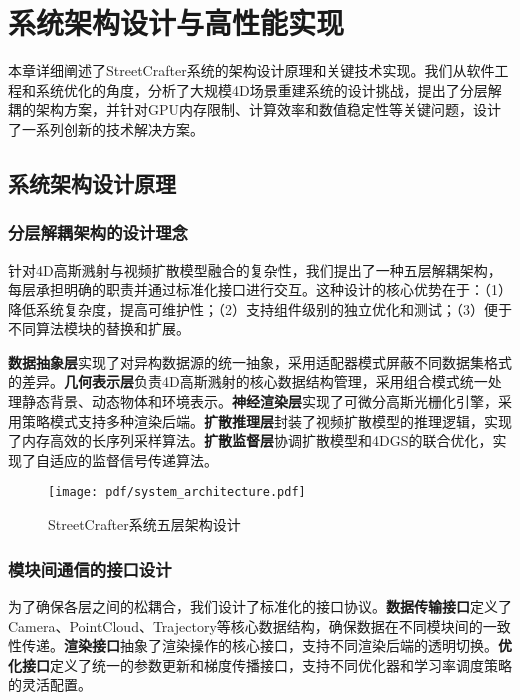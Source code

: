 
\chapter{系统架构设计与高性能实现}

本章详细阐述了StreetCrafter系统的架构设计原理和关键技术实现。我们从软件工程和系统优化的角度，分析了大规模4D场景重建系统的设计挑战，提出了分层解耦的架构方案，并针对GPU内存限制、计算效率和数值稳定性等关键问题，设计了一系列创新的技术解决方案。

\section{系统架构设计原理}

\subsection{分层解耦架构的设计理念}

针对4D高斯溅射与视频扩散模型融合的复杂性，我们提出了一种五层解耦架构，每层承担明确的职责并通过标准化接口进行交互。这种设计的核心优势在于：（1）降低系统复杂度，提高可维护性；（2）支持组件级别的独立优化和测试；（3）便于不同算法模块的替换和扩展。

\textbf{数据抽象层}实现了对异构数据源的统一抽象，采用适配器模式屏蔽不同数据集格式的差异。\textbf{几何表示层}负责4D高斯溅射的核心数据结构管理，采用组合模式统一处理静态背景、动态物体和环境表示。\textbf{神经渲染层}实现了可微分高斯光栅化引擎，采用策略模式支持多种渲染后端。\textbf{扩散推理层}封装了视频扩散模型的推理逻辑，实现了内存高效的长序列采样算法。\textbf{扩散监督层}协调扩散模型和4DGS的联合优化，实现了自适应的监督信号传递算法。

\begin{figure}[htbp]
  \centering
  \texttt{[image: pdf/system\_architecture.pdf]}
  \caption{StreetCrafter系统五层架构设计}
  \label{fig:system-architecture}
\end{figure}

\subsection{模块间通信的接口设计}

为了确保各层之间的松耦合，我们设计了标准化的接口协议。\textbf{数据传输接口}定义了Camera、PointCloud、Trajectory等核心数据结构，确保数据在不同模块间的一致性传递。\textbf{渲染接口}抽象了渲染操作的核心接口，支持不同渲染后端的透明切换。\textbf{优化接口}定义了统一的参数更新和梯度传播接口，支持不同优化器和学习率调度策略的灵活配置。

